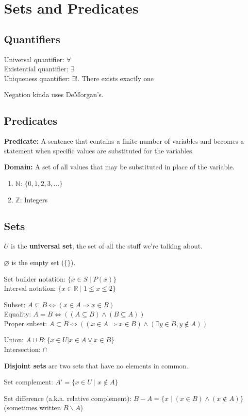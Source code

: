 \documentclass[12pt]{article}
\begin{document}
\section*{Sets and Predicates}

\subsection*{Quantifiers}

Universal quantifier: $\forall$\\
Existential quantifier: $\exists$\\
Uniqueness quantifier: $\exists!$. There exists exactly one

Negation kinda uses DeMorgan's.

\subsection*{Predicates}

\textbf{Predicate:} A sentence that contains a finite number of variables and becomes a statement when specific values are substituted for the variables.

\textbf{Domain:} A set of all values that may be substituted in place of the variable.

\begin{enumerate}
    \item $\mathbb N$: $\{0, 1, 2, 3, ...\}$
    \item $\mathbb{Z}$: Integers
\end{enumerate}

\subsection*{Sets}

$U$ is the \textbf{universal set}, the set of all the stuff we're talking about.

$\varnothing$ is the empty set ($\{\}$).

Set builder notation: $\{ x \in S \mid P(x) \}$\\
Interval notation: $\{x \in \mathbb R \mid 1 \leq x \leq 2\}$

Subset: $A \subseteq B \Leftrightarrow (x \in A \Rightarrow x \in B)$\\
Equality: $A = B \Leftrightarrow ((A \subseteq B) \land (B \subseteq A))$\\
Proper subset: $A \subset B \Leftrightarrow ((x \in A \Rightarrow x \in B) \land (\exists y \in B, y \not\in A))$

Union: $A \cup B: \{x \in U | x \in A \lor x \in B\}$\\
Intersection: $\cap$

\textbf{Disjoint sets} are two sets that have no elements in common.

Set complement: $A' = \{x \in U \mid x \not\in A \}$

Set difference (a.k.a. relative complement): $B - A = \{x \mid (x \in B) \land (x \not\in A)\}$ (sometimes written $B\backslash A$)
\end{document}
